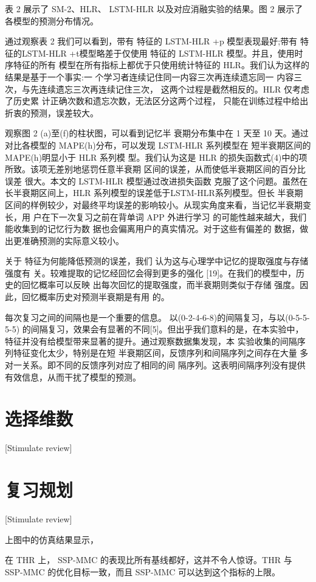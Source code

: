 表 2 展示了 SM-2、HLR、 LSTM-HLR 以及对应消融实验的结果。图 2 展示了各模型的预测分布情况。

通过观察表 2 我们可以看到，带有 特征的 LSTM-HLR +p 模型表现最好;带有 特 征的LSTM-HLR +t模型略差于仅使用 特征的 LSTM-HLR 模型。并且，使用时序特征的所有 模型在所有指标上都优于只使用统计特征的 HLR。我们认为这样的结果是基于一个事实:一 个学习者连续记住同一内容三次再连续遗忘同一 内容三次，与先连续遗忘三次再连续记住三次， 这两个过程是截然相反的。HLR 仅考虑了历史累 计正确次数和遗忘次数，无法区分这两个过程， 只能在训练过程中给出折衷的预测，误差较大。

观察图 2 (a)至(f)的柱状图，可以看到记忆半 衰期分布集中在 1 天至 10 天。通过对比各模型的 MAPE(h)分布，可以发现 LSTM-HLR 系列模型在 短半衰期区间的 MAPE(h)明显小于 HLR 系列模 型。我们认为这是 HLR 的损失函数式(4)中的项所致。该项无差别地惩罚任意半衰期 区间的误差，从而使低半衰期区间的百分比误差 很大。本文的 LSTM-HLR 模型通过改进损失函数 克服了这个问题。虽然在长半衰期区间上，HLR 系列模型的误差低于LSTM-HLR系列模型。但长 半衰期区间的样例较少，对最终平均误差的影响较小。从现实角度来看，当记忆半衰期变长，用 户在下一次复习之前在背单词 APP 外进行学习 的可能性越来越大，我们能收集到的记忆行为数 据也会偏离用户的真实情况。对于这些有偏差的 数据，做出更准确预测的实际意义较小。

关于 特征为何能降低预测的误差，我们 认为这与心理学中记忆的提取强度与存储强度有 关。较难提取的记忆经回忆会得到更多的强化 [19]。在我们的模型中，历史的回忆概率可以反映 出每次回忆的提取强度，而半衰期则类似于存储 强度。因此，回忆概率历史对预测半衰期是有用 的。

每次复习之间的间隔也是一个重要的信息。 以(0-2-4-6-8)的间隔复习，与以(0-5-5-5-5) 的间隔复习，效果会有显著的不同[5]。但出乎我们意料的是，在本实验中， 特征并没有给模型带来显著的提升。通过观察数据集发现，本 实验收集的间隔序列特征变化太少，特别是在短 半衰期区间，反馈序列和间隔序列之间存在大量 多对一关系。即不同的反馈序列对应了相同的间 隔序列。这表明间隔序列没有提供有效信息，从而干扰了模型的预测。

\section{选择维数}[Stimulate review]

\section{复习规划}[Stimulate review]

上图中的仿真结果显示，

在 THR 上， SSP-MMC 的表现比所有基线都好，这并不令人惊讶。THR 与 SSP-MMC 的优化目标一致，而且 SSP-MMC 可以达到这个指标的上限。

